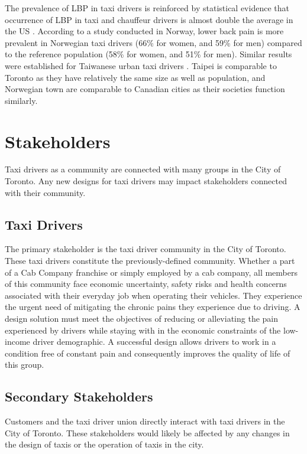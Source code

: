 \documentclass[11pt]{article}
\begin{document}
The prevalence of LBP in taxi drivers is reinforced by statistical evidence that occurrence of LBP 
in taxi and chauffeur drivers is almost double the average in the US \cite{68}. According to a study conducted in Norway, lower 
back pain is more prevalent in Norwegian taxi drivers (66\% for women, and 59\% for men) 
compared to the reference population (58\% for women, and 51\% for men)\cite{Question?}. Similar results 
were established for Taiwanese urban taxi drivers \cite{Question?}. 
Taipei is comparable to Toronto as they have relatively the same size as well as population, 
and Norwegian town are comparable to Canadian cities as their societies function similarly. 



\section{Stakeholders}
\label{sec:stake}
Taxi drivers as a community are connected with many groups in the City
of Toronto. Any new designs for taxi drivers may impact
stakeholders connected with their community.
 
\subsection{Taxi Drivers}
The primary stakeholder is the taxi driver community in the City of
Toronto. These taxi drivers constitute the previously-defined community. 
Whether a part of a Cab Company franchise or simply employed by a cab company, 
all members of this community face economic uncertainty, safety risks and health 
concerns associated with their everyday job when operating their vehicles. They 
experience the urgent need of mitigating the chronic pains they experience due 
to driving. A design solution must meet the objectives of reducing or 
alleviating the pain experienced by drivers while staying with in the 
economic constraints of the low-income driver demographic. A successful
design allows drivers to work in a condition free of constant pain and 
consequently improves the quality of life of this group. 
 
\subsection{Secondary Stakeholders} 
Customers and the taxi driver union directly interact with taxi 
drivers in the City of Toronto. These stakeholders would likely be 
affected by any changes in the design of taxis or the operation of taxis 
in the city. 
\end{document}
